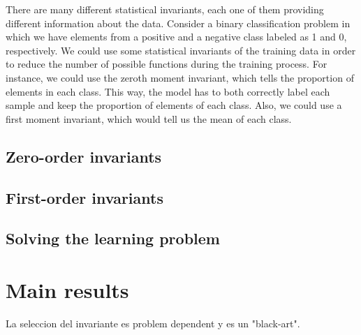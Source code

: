 There are many different statistical invariants, each one of them providing different information
about the data. Consider a binary classification problem in which we have elements from a
positive and a negative class labeled as 1 and 0, respectively. We could use some statistical
invariants of the training data in order to reduce the number of possible functions during
the training process. For instance, we could use the zeroth moment invariant, which tells the
proportion of elements in each class. This way, the model has to both correctly label each sample
and keep the proportion of elements of each class. Also, we could use a first moment invariant,
which would tell us the mean of each class.


\subsection{Zero-order invariants}

\subsection{First-order invariants}




\subsection{Solving the learning problem}

\section{Main results}

La seleccion del invariante es problem dependent y es un "black-art".
